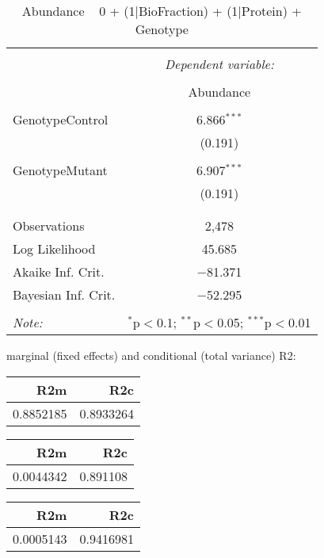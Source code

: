 \documentclass[11pt]{report}
\begin{document}
\begin{table}[!htbp] \centering 
  \caption{Abundance ~ 0 + (1|BioFraction) + (1|Protein) + Genotype} 
  \label{} 
\begin{tabular}{@{\extracolsep{5pt}}lc} 
\\[-1.8ex]\hline 
\hline \\[-1.8ex] 
 & \multicolumn{1}{c}{\textit{Dependent variable:}} \\ 
\cline{2-2} 
\\[-1.8ex] & Abundance \\ 
\hline \\[-1.8ex] 
 GenotypeControl & 6.866$^{***}$ \\ 
  & (0.191) \\ 
  & \\ 
 GenotypeMutant & 6.907$^{***}$ \\ 
  & (0.191) \\ 
  & \\ 
\hline \\[-1.8ex] 
Observations & 2,478 \\ 
Log Likelihood & 45.685 \\ 
Akaike Inf. Crit. & $-$81.371 \\ 
Bayesian Inf. Crit. & $-$52.295 \\ 
\hline 
\hline \\[-1.8ex] 
\textit{Note:}  & \multicolumn{1}{r}{$^{*}$p$<$0.1; $^{**}$p$<$0.05; $^{***}$p$<$0.01} \\ 
\end{tabular} 
\end{table} 
marginal (fixed effects) and conditional (total variance) R2:

\begin{tabular}{r|r}
\hline
R2m & R2c\\
\hline
0.8852185 & 0.8933264\\
\hline
\end{tabular}

\begin{tabular}{r|r}
\hline
R2m & R2c\\
\hline
0.0044342 & 0.891108\\
\hline
\end{tabular}

\begin{tabular}{r|r}
\hline
R2m & R2c\\
\hline
0.0005143 & 0.9416981\\
\hline
\end{tabular}
\end{document}
